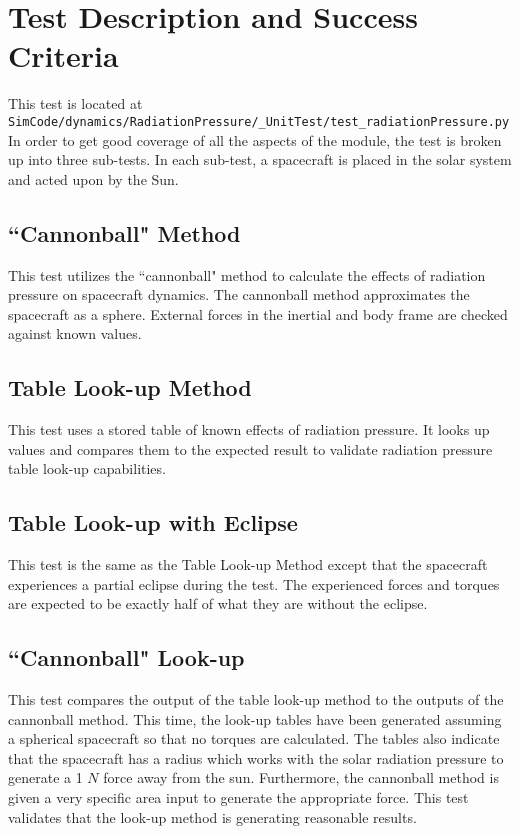 \section{Test Description and Success Criteria}
This test is located at {\tt SimCode/dynamics/RadiationPressure/\_UnitTest/test\_radiationPressure.py} In order to get good coverage of all the aspects of the module, the test is broken up into three sub-tests. In each sub-test, a spacecraft is placed in the solar system and acted upon by the Sun. \par

\subsection{``Cannonball" Method} This test utilizes the ``cannonball" method to calculate the effects of radiation pressure on spacecraft dynamics. The cannonball method approximates the spacecraft as a sphere. External forces in the inertial and body frame are checked against known values.
\subsection{Table Look-up Method} This test uses a stored table of known effects of radiation pressure. It looks up values and compares them to the expected result to validate radiation pressure table look-up capabilities.
\subsection{Table Look-up with Eclipse} This test is the same as the Table Look-up Method except that the spacecraft experiences a partial eclipse during the test. The experienced forces and torques are expected to be exactly half of what they are without the eclipse.
\subsection{``Cannonball" Look-up} This test compares the output of the table look-up method to the outputs of the cannonball method. This time, the look-up tables have been generated assuming a spherical spacecraft so that no torques are calculated. The tables also indicate that the spacecraft has a radius which works with the solar radiation pressure to generate a 1 $N$ force away from the sun. Furthermore, the cannonball method is given a very specific area input to generate the appropriate force. This test validates that the look-up method is generating reasonable results.

